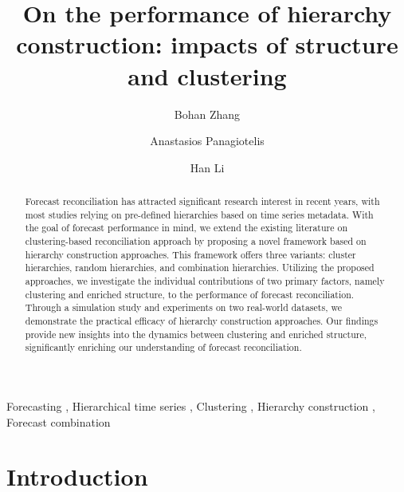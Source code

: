 \documentclass[a4paper,review,12pt,authoryear]{elsarticle}
\begin{document}
\begin{frontmatter}

  \title{On the performance of hierarchy construction: impacts of structure and clustering}

  \author[label1]{Bohan Zhang}
  \address[label1]{School of Economics and Management, Beihang University, Beijing, China}
  \author[label2]{Anastasios Panagiotelis}
  \address[label2]{The University of Sydney Business School, NSW 2006, Australia}
  \author[label3]{Han Li}
  \address[label3]{Centre for Actuarial Studies, Department of Economics, The University of Melbourne, Australia}

  \begin{abstract}

    Forecast reconciliation has attracted significant research interest in recent years, with most studies relying on pre-defined hierarchies based on time series metadata. With the goal of forecast performance in mind, we extend the existing literature on clustering-based reconciliation approach by proposing a novel framework based on hierarchy construction approaches. This framework offers three variants: cluster hierarchies, random hierarchies, and combination hierarchies. Utilizing the proposed approaches, we investigate the individual contributions of two primary factors, namely clustering and enriched structure, to the performance of forecast reconciliation.  Through a simulation study and experiments on two real-world datasets, we demonstrate the practical efficacy of hierarchy construction approaches. Our findings provide new insights into the dynamics between clustering and enriched structure, significantly enriching our understanding of forecast reconciliation.


  \end{abstract}

  \begin{keyword}
  Forecasting \sep
  Hierarchical time series \sep
  Clustering \sep
  Hierarchy construction \sep
  Forecast combination
  \end{keyword}

\end{frontmatter}

\newpage

\section{Introduction}
\end{document}
